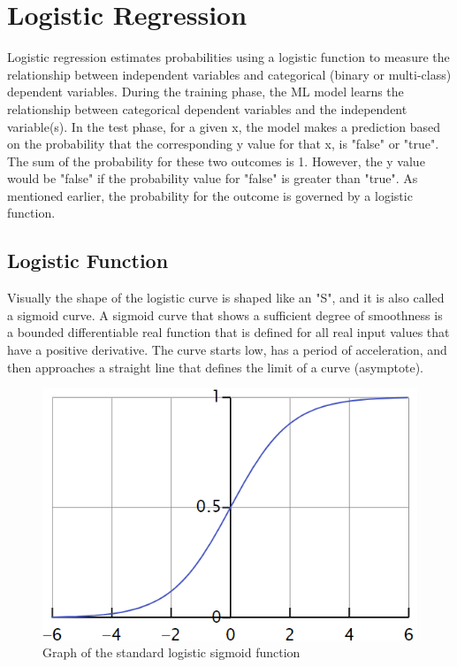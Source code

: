 \documentclass[conference]{IEEEtran}
\begin{document}
\section{Logistic Regression}
Logistic regression estimates probabilities using a logistic function to measure the relationship between independent variables and categorical (binary or multi-class) dependent variables. During the training phase, the ML model learns the relationship between categorical dependent variables and the independent variable(s). In the test phase, for a given x, the model makes a prediction based on the probability that the corresponding y value for that x, is "false" or "true". The sum of the
probability for these two outcomes is 1. However, the y value would be "false" if the probability value for "false" is greater than "true". As mentioned earlier, the probability for the outcome is governed by a logistic function.

\subsection{Logistic Function}
Visually the shape of the logistic curve is shaped like an "S", and it is also called a sigmoid curve.
A sigmoid curve that shows a sufficient degree of smoothness is a bounded differentiable real function that is defined for all real input values that have a positive derivative\cite{bb7}. The curve starts low, has a period of acceleration, and then approaches a straight line that defines the limit of a curve (asymptote).

\begin{figure}[h]
    \centering
    \includegraphics[scale=0.62]{figs/Lfunction.png}
    \caption{Graph of the standard logistic sigmoid function \cite{img}}
    \label{dabc}        
\end{figure}
\end{document}
